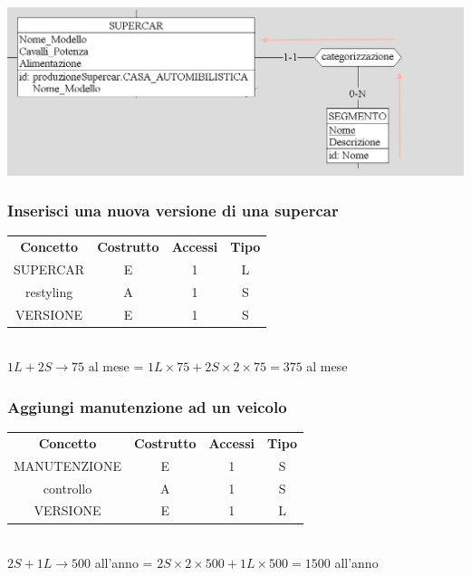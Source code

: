 \documentclass[12pt]{article}
\begin{document}
\begin{center}
    \includegraphics[scale=0.75]{images/navigationSchemes/supercarSegmento.png}
\end{center}

\subsubsection{Inserisci una nuova versione di una supercar} 

\begin{table}[H]
    \centering
    \begin{tabular}{c c c c}
        \rowcolor{red!20!}
        \textbf{Concetto} & \textbf{Costrutto} & \textbf{Accessi} &
        \textbf{Tipo}\\
        SUPERCAR & E & 1 & L \\
        restyling & A & 1 & S \\
        VERSIONE & E & 1 & S \\
    \end{tabular}\\
    \( 1L + 2S \rightarrow 75 \) al mese = \( 1L \times 75 + 2S \times 2 \times
    75 = 375 \) al mese
\end{table}

\subsubsection{Aggiungi manutenzione ad un veicolo} 

\begin{table}[H]
    \centering
    \begin{tabular}{c c c c}
        \rowcolor{red!20!}
        \textbf{Concetto} & \textbf{Costrutto} & \textbf{Accessi} &
        \textbf{Tipo}\\
        MANUTENZIONE & E & 1 & S \\
        controllo & A & 1 & S \\
        VERSIONE & E & 1 & L \\
    \end{tabular}\\
    \( 2S  + 1L \rightarrow  500\) all'anno = \( 2S \times 2 \times 500 + 1L
    \times 500 = 1500 \) all'anno
\end{table}
\end{document}
